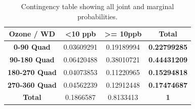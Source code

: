 \documentclass{article}%
\begin{document}
\begin{table}[H]
	\begin{center}
		\begin{tabular}{|cl|cl|cl|cl|}
\hline
\multicolumn{2}{|c|}{\textbf{Ozone / WD}} & \multicolumn{2}{c|}{\textbf{\textless 10 ppb}} & \multicolumn{2}{c|}{\textbf{\textgreater = 10ppb}} & \multicolumn{2}{c|}{\textbf{Total}}      \\ \hline
\multicolumn{2}{|c|}{\textbf{0-90 Quad}}              & \multicolumn{2}{c|}{0.03609291}            & \multicolumn{2}{c|}{0.19189994}                      & \multicolumn{2}{c|}{\textbf{0.22799285}} \\ \hline
\multicolumn{2}{|c|}{\textbf{90-180 Quad}}            & \multicolumn{2}{c|}{0.06420488}            & \multicolumn{2}{c|}{0.38010721}                      & \multicolumn{2}{c|}{\textbf{0.44431209}} \\ \hline
\multicolumn{2}{|c|}{\textbf{180-270 Quad}}           & \multicolumn{2}{c|}{{0.04073853}}   & \multicolumn{2}{c|}{{0.11220965}}             & \multicolumn{2}{c|}{\textbf{0.15294818}} \\ \hline
\multicolumn{2}{|c|}{\textbf{270-360 Quad}}           & \multicolumn{2}{c|}{0.04562239}            & \multicolumn{2}{c|}{0.12912448}                      & \multicolumn{2}{c|}{\textbf{0.17474687}} \\ \hline
\multicolumn{2}{|c|}{\textbf{Total}}                  & \multicolumn{2}{c|}{0.1866587}             & \multicolumn{2}{c|}{0.8133413}                       & \multicolumn{2}{c|}{\textbf{1}}          \\ \hline
		\end{tabular}
	\caption{\footnotesize Contingency table showing all joint and marginal probabilities.}	
	\end{center}
\end{table}
\end{document}
